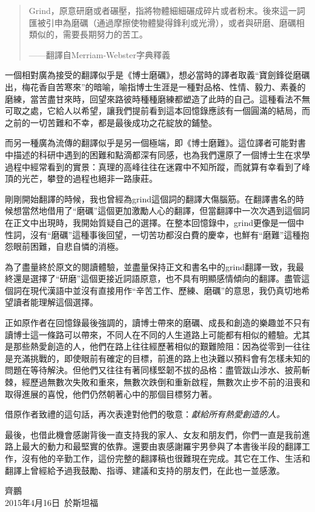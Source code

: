 \documentclass[12pt,UTF8,nofonts]{book}
\begin{document}
\begin{quote}
Grind，原意研磨或者碾壓，指將物體細細碾成碎片或者粉末。後來這一詞匯被引申為磨礪（通過摩擦使物體變得鋒利或光滑），或者與研磨、磨礪相類似的，需要長期努力的苦工。

——翻譯自Merriam-Webster字典釋義
\end{quote}

一個相對廣為接受的翻譯似乎是《博士磨礪》，想必當時的譯者取義“寶劍鋒從磨礪出，梅花香自苦寒來”的暗喻，喻指博士生涯是一種對品格、性情、毅力、素養的磨練，當苦盡甘來時，回望來路彼時種種磨練都塑造了此時的自己。這種看法不無可取之處，它給人以希望，讓我們提前看到這本回憶錄應該有一個圓滿的結局，而之前的一切苦難和不幸，都是最後成功之花綻放的鋪墊。

而另一種廣為流傳的翻譯似乎是另一個極端，即《博士磨難》。這位譯者可能對書中描述的科研中遇到的困難和點滴都深有同感，也為我們還原了一個博士生在求學過程中經常看到的實景：真理的高峰往往在迷霧中不知所蹤，而就算有幸看到了峰頂的光芒，攀登的過程也絕非一路康莊。

剛剛開始翻譯的時候，我也曾經為grind這個詞的翻譯大傷腦筋。在翻譯書名的時候想當然地借用了“磨礪”這個更加激勵人心的翻譯，但當翻譯中一次次遇到這個詞在正文中出現時，我開始質疑自己的選擇。在整本回憶錄中，grind更像是一個中性詞，沒有“磨礪”這種事後回望，一切苦功都沒白費的慶幸，也鮮有“磨難”這種抱怨眼前困難，自悲自憐的消極。

為了盡量終於原文的閱讀體驗，並盡量保持正文和書名中的grind翻譯一致，我最終還是選擇了“研磨”這個更接近詞語原意，也不具有明顯感情傾向的翻譯。盡管這個詞在現代漢語中並沒有直接用作“辛苦工作、歷練、磨礪”的意思，我仍真切地希望讀者能理解這個選擇。


正如原作者在回憶錄最後強調的，讀博士帶來的磨礪、成長和創造的樂趣並不只有讀博士這一條路可以帶來，不同人在不同的人生道路上可能都有相似的體驗。尤其是那些熱愛創造的人，他們在路上往往經歷著相似的艱難險阻：因為從零到一往往是充滿挑戰的，即使眼前有確定的目標，前進的路上也決難以預料會有怎樣未知的問題在等待解決。但他們又往往有著同樣堅韌不拔的品格：盡管跋山涉水、披荊斬棘，經歷過無數次失敗和重來，無數次跌倒和重新啟程，無數次止步不前的沮喪和取得進展的喜悅，他們仍然朝著心中的那個目標努力著。

借原作者致禮的這句話，再次表達對他們的敬意：\emph{獻給所有熱愛創造的人。}

最後，也借此機會感謝背後一直支持我的家人、女友和朋友們，你們一直是我前進路上最大的動力和最堅實的依靠。還要由衷感謝羅宇男參與了本書後半段的翻譯工作，沒有他的辛勤工作，這份完整的翻譯稿也很難現在完成。其它在工作、生活和翻譯上曾經給予過我鼓勵、指導、建議和支持的朋友們，在此也一並感激。
\\[3em]
\begin{flushright}
齊鵬\\
2015年4月16日\ 於斯坦福
\end{flushright}
\end{document}
